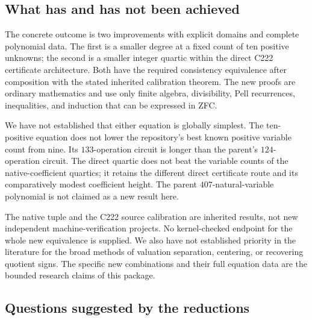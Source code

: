 \documentclass[11pt,letterpaper]{article}
\theoremstyle{definition}
\theoremstyle{remark}
\numberwithin{equation}{section}
\begin{document}
\subsection{What has and has not been achieved}

The concrete outcome is two improvements with explicit domains and
complete polynomial data. The first is a smaller degree at a fixed count
of ten positive unknowns; the second is a smaller integer quartic within
the direct C222 certificate architecture. Both have the required
consistency equivalence after composition with the stated inherited
calibration theorem. The new proofs are ordinary mathematics and use
only finite algebra, divisibility, Pell recurrences, inequalities, and
induction that can be expressed in ZFC.

We have not established that either equation is globally simplest.
The ten-positive equation does not lower the repository's best known
positive variable count from nine. Its $133$-operation circuit is longer
than the parent's $124$-operation circuit. The direct quartic does not
beat the variable counts of the native-coefficient quartics; it retains
the different direct certificate route and its comparatively modest
coefficient height. The parent $407$-natural-variable polynomial is not
claimed as a new result here.

The native tuple and the C222 source calibration are inherited results,
not new independent machine-verification projects. No kernel-checked
endpoint for the whole new equivalence is supplied. We also have not
established priority in the literature for the broad methods of
valuation separation, centering, or recovering quotient signs. The
specific new combinations and their full equation data are the bounded
research claims of this package.

\subsection{Questions suggested by the reductions}
\end{document}
